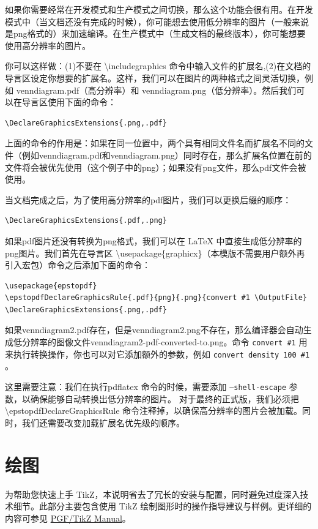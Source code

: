如果你需要经常在开发模式和生产模式之间切换，那么这个功能会很有用。在开发模式中（当文档还没有完成的时候），你可能想去使用低分辨率的图片（一般来说是png格式的）来加速编译。在生产模式中（生成文档的最终版本），你可能想要使用高分辨率的图片。

你可以这样做：(1)不要在 \backslash includegraphics 命令中输入文件的扩展名,(2)在文档的导言区设定你想要的扩展名。这样，我们可以在图片的两种格式之间灵活切换，例如 venndiagram.pdf（高分辨率）和 venndiagram.png（低分辨率）。然后我们可以在导言区使用下面的命令：
\begin{verbatim}
\DeclareGraphicsExtensions{.png,.pdf}
\end{verbatim}
上面的命令的作用是：如果在同一位置中，两个具有相同文件名而扩展名不同的文件（例如venndiagram.pdf和venndiagram.png）同时存在，那么扩展名位置在前的文件将会被优先使用（这个例子中的png）；如果没有png文件，那么pdf文件会被使用。

当文档完成之后，为了使用高分辨率的pdf图片，我们可以更换后缀的顺序：
\begin{verbatim}
\DeclareGraphicsExtensions{.pdf,.png}
\end{verbatim}
如果pdf图片还没有转换为png格式，我们可以在 \LaTeX{} 中直接生成低分辨率的png图片。我们首先在导言区 \backslash usepackage\{graphicx\}（本模版不需要用户额外再引入宏包）命令之后添加下面的命令：
\begin{verbatim}
\usepackage{epstopdf}
\epstopdfDeclareGraphicsRule{.pdf}{png}{.png}{convert #1 \OutputFile}
\DeclareGraphicsExtensions{.png,.pdf}
\end{verbatim}
如果venndiagram2.pdf存在，但是venndiagram2.png不存在，那么编译器会自动生成低分辨率的图像文件venndiagram2-pdf-converted-to.png。命令 \texttt{convert \#1} 用来执行转换操作，你也可以对它添加额外的参数，例如 \texttt{convert \-density 100 \#1} 。

这里需要注意：我们在执行pdflatex 命令的时候，需要添加 \texttt{--shell-escape} 参数，以确保能够自动转换出低分辨率的图片。
对于最终的正式版，我们必须把 \backslash epstopdfDeclareGraphicsRule 命令注释掉，以确保高分辨率的图片会被加载。同时，我们还需要改变加载扩展名优先级的顺序。


\section{绘图}
为帮助您快速上手 TikZ，本说明省去了冗长的安装与配置，同时避免过度深入技术细节。此部分主要包含使用 TikZ 绘制图形时的操作指导建议与样例。更详细的内容可参见 \href{https://tikz.dev/tutorials-guidelines}{PGF/TikZ Manual}。

